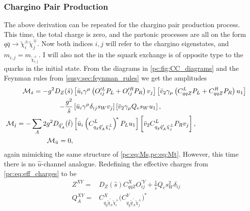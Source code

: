 \documentclass[../main.tex]{subfiles}
\begin{document}
\subsubsection*{Chargino Pair Production}
The above derivation can be repeated for the chargino pair production process.
This time, the total charge is zero, and the partonic processes are all on the form \(q\bar{q} \to \tilde\chi^\pm_i \tilde\chi^\mp_j\).
Now both indices \(i, j\) will refer to the chargino eigenstates, and \(m_{i,j} = m_{\tilde\chi^\pm_{i,j}}\).
I will also not the in the squark exchange is of opposite type to the quarks in the initial state.
From the diagrams in \cref{pc:fig:CC_diagrams} and the Feynman rules from \cref{susy:sec:feynman_rules} we get the amplitudes
\begin{subequations}
  \begin{align}
    \nonumber
    \mathcal{M}_{\hat{s}} = -g^2 D_Z(\hat{s})                            & \left[ \bar{u}_i\gamma^\mu\left(O^{\prime L}_{ij}P_L + O^{\prime R}_{ij}P_R\right) v_j \right] \left[ \bar{v}_2 \gamma_\mu \left(C^L_{qqZ}P_L + C^R_{qqZ}P_R\right) u_1 \right]
    \\
    \label{pc:eq:CC_Ms}
    -\frac{g^2}{\hat{s}}                                        & \left[ \bar{u}_i\gamma^\mu \delta_{ij} s_W v_j \right] \left[ \bar{v}_2 \gamma_\mu Q_e s_W u_1 \right],                                                                          \\
    \label{pc:eq:CC_Mt}
    \mathcal{M}_{\hat{t}} = -\sum_A 2g^2 D_{\tilde{q}^\prime_A}(\hat{t}) & \left[ \bar{u}_i \left(C_{q_g \tilde{q}_A^\prime \tilde\chi^\pm_i}^L\right)^{\!\ast} P_L u_1 \right] \left[ \bar{v}_2 C_{q_g \tilde{q}_A^\prime \tilde\chi^\pm_j}^L P_R v_j\right], \\
    \label{pc:eq:CC_Mu}
    \mathcal{M}_{\hat{u}} = 0,                                           &
  \end{align}
\end{subequations}
again mimicking the same structure of \cref{pc:eq:Ms,pc:eq:Mt}.
However, this time there is no \(\hat{u}\)-channel analogue.
Redefining the effective charges from \cref{pc:eq:eff_charges} to be
\begin{subequations}
  \begin{align*}
    Z^{XY} =   & D_Z(\hat{s}) C_{qqZ}^X O_{ij}^{\prime Y} + \frac{1}{\hat{s}} Q_e s_W^2 \delta_{ij}                               \\
    Q_A^{XY} = & C_{q_g \tilde{q}_A^\prime \tilde\chi^\pm_i}^X \bigl(C_{q_g \tilde{q}_A^\prime \tilde\chi^\pm_j}^Y\bigr)^{\!\ast}
  \end{align*}
\end{subequations}
\end{document}
